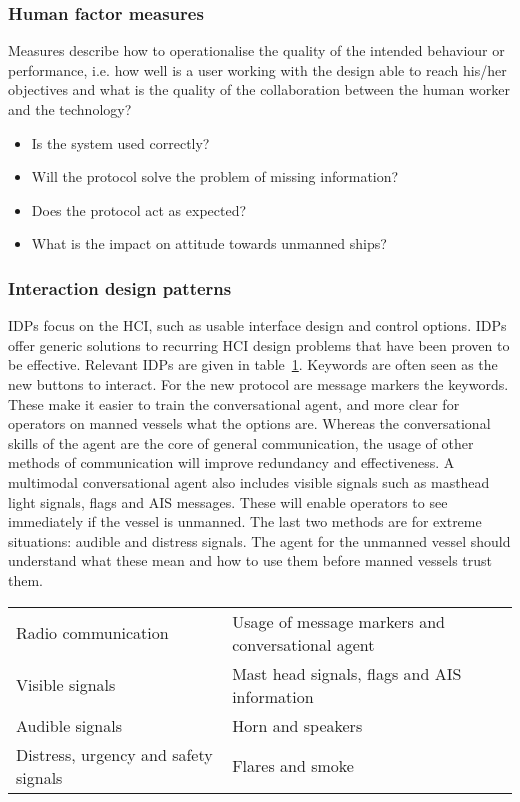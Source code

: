 \subsubsection{Human factor measures}
Measures describe how to operationalise the quality of the intended behaviour or performance, i.e. how well is a user working with the design able to reach his/her objectives and what is the quality of the collaboration between the human worker and the technology?
\begin{multicols}{2}
\begin{itemize}
	\item Is the system used correctly?
	\item Will the protocol solve the problem of missing information?
	\item Does the protocol act as expected?
	\item What is the impact on attitude towards unmanned ships?
\end{itemize}
\end{multicols}

\subsubsection{Interaction design patterns}
\acf{IDPs} focus on the \acf{HCI}, such as usable interface design and control options. IDPs offer generic solutions to recurring HCI design problems that have been proven to be effective. Relevant IDPs are given in table~\ref{tab:IDPs}.
Keywords are often seen as the new buttons to interact. For the new protocol are message markers the keywords. These make it easier to train the conversational agent, and more clear for operators on manned vessels what the options are. Whereas the conversational skills of the agent are the core of general communication, the usage of other methods of communication will improve redundancy and effectiveness. 
A multimodal conversational agent also includes visible signals such as masthead light signals, flags and AIS messages. These will enable operators to see immediately if the vessel is unmanned.
The last two methods are for extreme situations: audible and distress signals. The agent for the unmanned vessel should understand what these mean and how to use them before manned vessels trust them.

\begin{table}[htbp]
	\centering
	\begin{tabular}{l|l}
		\toprule
		Radio communication & Usage of message markers and conversational agent \\
		Visible signals & Mast head signals, flags and \ac{AIS} information \\
		Audible signals & Horn and speakers \\
		Distress, urgency and safety signals & Flares and smoke \\
		\bottomrule
	\end{tabular}
	
	\label{tab:IDPs}
\end{table}

